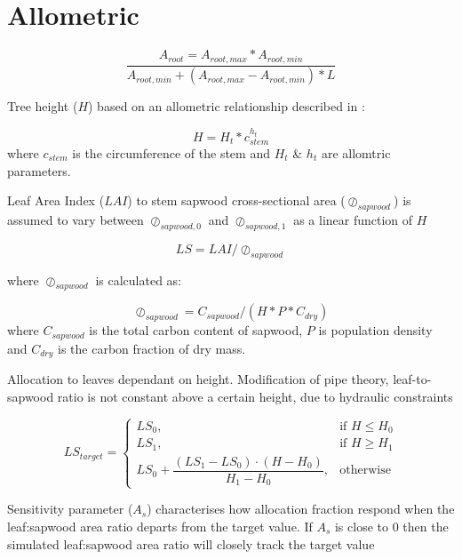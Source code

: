 \section{Allometric}
\label{Allometric}

\begin{equation}
	\frac{A_{root}=A_{root,max}*A_{root,min}}{A_{root,min}+(A_{root,max}-A_{root,min})*L}
\end{equation}

Tree height ($H$) based on an allometric relationship described in \citet{Causton1985}:

\begin{equation}
	H = H_{t} * c_{stem}^{h_{t}}
\end{equation}
where $c_{stem}$ is the circumference of the stem and $H_{t}$ \& $h_{t}$ are allomtric parameters.
                                
Leaf Area Index ($LAI$) to stem sapwood cross-sectional area ($\oslash_{sapwood}$) is assumed to vary between $\oslash_{sapwood,0}$ and $\oslash_{sapwood,1}$ as a linear function of $H$ 

\begin{equation}
	LS = LAI / \oslash_{sapwood}
\end{equation}

where $\oslash_{sapwood}$ is calculated as:

\begin{equation}
	\oslash_{sapwood} = C_{sapwood}/(H * P *C_{dry} )
\end{equation}
where $C_{sapwood}$ is the total carbon content of sapwood, $P$ is population density and $C_{dry}$ is the carbon fraction of dry mass.

Allocation to leaves dependant on height. Modification of pipe theory, leaf-to-sapwood ratio is not constant above a certain  height, due to hydraulic constraints \citep{magnani2000age,Deckmyn2006}

\begin{equation}
	LS_{target}=
	\begin{cases}
		    LS_{0},& \text{if } H\le H_{0} \\ 
		    LS_{1},& \text{if } H\ge H_{1} \\
		    LS_{0} + \dfrac{(LS_{1}-LS_{0})\cdot (H-H_{0})}{H_{1}-H_{0}},& \text{otherwise}
		\end{cases}
\end{equation}

Sensitivity parameter ($A_{s}$) characterises how allocation fraction respond when the leaf:sapwood area ratio departs from the target value. If $A_{s}$ is close to 0 then the simulated leaf:sapwood area ratio will closely track the target value

